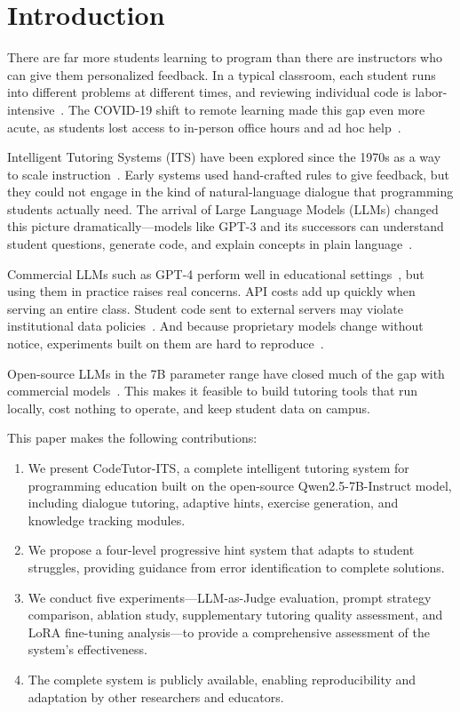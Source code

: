 \documentclass[journal,article,submit,pdftex,moreauthors]{Definitions/mdpi}
\begin{document}
\section{Introduction}

There are far more students learning to program than there are instructors who can give them personalized feedback. In a typical classroom, each student runs into different problems at different times, and reviewing individual code is labor-intensive~\cite{ref1}. The COVID-19 shift to remote learning made this gap even more acute, as students lost access to in-person office hours and ad hoc help~\cite{ref2}.

Intelligent Tutoring Systems (ITS) have been explored since the 1970s as a way to scale instruction~\cite{ref3}. Early systems used hand-crafted rules to give feedback, but they could not engage in the kind of natural-language dialogue that programming students actually need. The arrival of Large Language Models (LLMs) changed this picture dramatically---models like GPT-3 and its successors can understand student questions, generate code, and explain concepts in plain language~\cite{ref4}.

Commercial LLMs such as GPT-4 perform well in educational settings~\cite{ref5}, but using them in practice raises real concerns. API costs add up quickly when serving an entire class. Student code sent to external servers may violate institutional data policies~\cite{ref6}. And because proprietary models change without notice, experiments built on them are hard to reproduce~\cite{ref7}.

Open-source LLMs in the 7B parameter range have closed much of the gap with commercial models~\cite{ref8}. This makes it feasible to build tutoring tools that run locally, cost nothing to operate, and keep student data on campus.

This paper makes the following contributions:
\begin{enumerate}
\item We present CodeTutor-ITS, a complete intelligent tutoring system for programming education built on the open-source Qwen2.5-7B-Instruct model, including dialogue tutoring, adaptive hints, exercise generation, and knowledge tracking modules.
\item We propose a four-level progressive hint system that adapts to student struggles, providing guidance from error identification to complete solutions.
\item We conduct five experiments---LLM-as-Judge evaluation, prompt strategy comparison, ablation study, supplementary tutoring quality assessment, and LoRA fine-tuning analysis---to provide a comprehensive assessment of the system's effectiveness.
\item The complete system is publicly available, enabling reproducibility and adaptation by other researchers and educators.
\end{enumerate}
\end{document}
